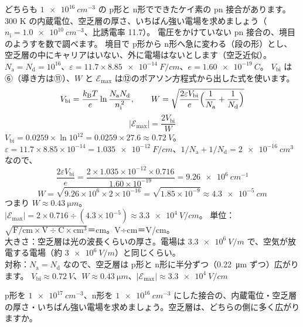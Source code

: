 \label{ph:原-9:ex7}
\begin{phreidai}
どちらも $\qty{1e16}{cm^{-3}}$ の p形と n形でできたケイ素の pn 接合があります。300 K の内蔵電位、空乏層の厚さ、いちばん強い電場を求めましょう（$n_{\mathrm i}=\qty{1.0e10}{cm^{-3}}$、比誘電率 11.7）。
\phbamen
電圧をかけていない pn 接合の、境目のようすを数で調べます。
\phmushi
境目で p形から n形へ急に変わる（段の形）とし、空乏層の中にキャリアはいない、外に電場はないとします（空乏近似）。
\phzu
$N_{\mathrm a}=N_{\mathrm d}=10^{16}$、$\varepsilon=11.7\times\qty{8.85e-14}{F/cm}$、$e=\qty{1.60e-19}{C}$。
\phriyu
$V_{\mathrm{bi}}$ は⑥（導き方は⑪）、$W$ と $\mathcal E_{\max}$ は⑫のポアソン方程式から出した式を使います。
\phtateru
\[ V_{\mathrm{bi}}=\frac{k_{\mathrm B}T}{e}\ln\frac{N_{\mathrm a}N_{\mathrm d}}{n_{\mathrm i}^{\,2}},\qquad W=\sqrt{\frac{2\varepsilon V_{\mathrm{bi}}}{e}\Bigl(\frac1{N_{\mathrm a}}+\frac1{N_{\mathrm d}}\Bigr)} \]
\[ |\mathcal E_{\max}|=\frac{2V_{\mathrm{bi}}}{W} \]
\phtoku
$V_{\mathrm{bi}}=0.0259\times\ln10^{12}=0.0259\times27.6\approx\qty{0.72}{V}$。\\
$\varepsilon=11.7\times8.85\times10^{-14}=\qty{1.035e-12}{F/cm}$、$1/N_{\mathrm a}+1/N_{\mathrm d}=\qty{2e-16}{cm^3}$ なので、
\[ \frac{2\varepsilon V_{\mathrm{bi}}}{e}=\frac{2\times1.035\times10^{-12}\times0.716}{1.60\times10^{-19}}=\qty{9.26e6}{cm^{-1}} \]
\[ W=\sqrt{9.26\times10^{6}\times2\times10^{-16}}=\sqrt{1.85\times10^{-9}}\approx\qty{4.3e-5}{cm} \]
つまり $W\approx\qty{0.43}{\micro m}$。\\
$|\mathcal E_{\max}|=2\times0.716\div(4.3\times10^{-5})\approx\qty{3.3e4}{V/cm}$。
\phtashikame
単位：$\sqrt{\text{F/cm}\times\text{V}\div\text{C}\times\text{cm}^3}$＝cm。V÷cm＝V/cm。\\
大きさ：空乏層は光の波長くらいの厚さ。電場は $\qty{3.3e6}{V/m}$ で、空気が放電する電場（約 $\qty{3e6}{V/m}$）と同じくらい。\\
対称：$N_{\mathrm a}=N_{\mathrm d}$ なので、空乏層は p形と n形に半分ずつ（\qty{0.22}{\micro m} ずつ）広がります。
\kotae $V_{\mathrm{bi}}\approx\qty{0.72}{V}$、$W\approx\qty{0.43}{\micro m}$、$|\mathcal E_{\max}|\approx\qty{3.3e4}{V/cm}$
\end{phreidai}
\begin{jibun}
p形を $\qty{1e17}{cm^{-3}}$、n形を $\qty{1e16}{cm^{-3}}$ にした接合の、内蔵電位・空乏層の厚さ・いちばん強い電場を求めましょう。空乏層は、どちらの側に多く広がりますか。
\end{jibun}

